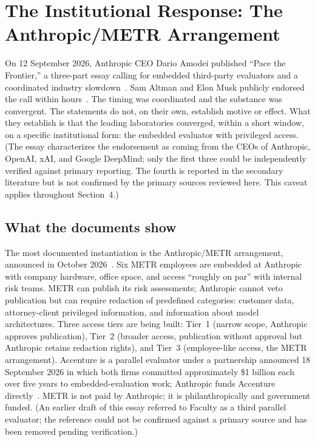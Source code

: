 \section{The Institutional Response: The Anthropic/METR Arrangement}

On 12 September 2026, Anthropic CEO Dario Amodei published ``Pace the Frontier,'' a three-part essay calling for embedded third-party evaluators and a coordinated industry slowdown~\cite{amodei2026,bbc2026,techcrunch2026}. Sam Altman and Elon Musk publicly endorsed the call within hours~\cite{techcrunch2026}. The timing was coordinated and the substance was convergent. The statements do not, on their own, establish motive or effect. What they establish is that the leading laboratories converged, within a short window, on a specific institutional form: the embedded evaluator with privileged access. (The essay characterizes the endorsement as coming from the CEOs of Anthropic, OpenAI, xAI, and Google DeepMind; only the first three could be independently verified against primary reporting. The fourth is reported in the secondary literature but is not confirmed by the primary sources reviewed here. This caveat applies throughout Section~4.)

\subsection{What the documents show}

The most documented instantiation is the Anthropic/METR arrangement, announced in October 2026~\cite{anthropic2026a}. Six METR employees are embedded at Anthropic with company hardware, office space, and access ``roughly on par'' with internal risk teams. METR can publish its risk assessments; Anthropic cannot veto publication but can require redaction of predefined categories: customer data, attorney-client privileged information, and information about model architectures. Three access tiers are being built: Tier~1 (narrow scope, Anthropic approves publication), Tier~2 (broader access, publication without approval but Anthropic retains redaction rights), and Tier~3 (employee-like access, the METR arrangement). Accenture is a parallel evaluator under a partnership announced 18 September 2026 in which both firms committed approximately \$1 billion each over five years to embedded-evaluation work; Anthropic funds Accenture directly~\cite{anthropic2026b,cnbc2026,wsj2026}. METR is not paid by Anthropic; it is philanthropically and government funded. (An earlier draft of this essay referred to Faculty as a third parallel evaluator; the reference could not be confirmed against a primary source and has been removed pending verification.)

